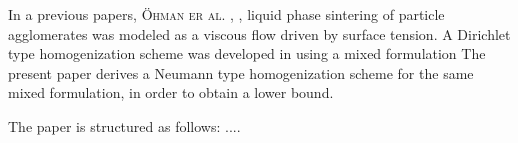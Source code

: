 \documentclass[12pt,a4paper,fleqn]{article}
\begin{document}
In a previous papers, \textsc{\"Ohman er al.} \cite{Ohman2012a}, \cite{Ohman2012b}, liquid phase sintering of particle agglomerates was modeled as a viscous flow driven by surface tension. A Dirichlet type homogenization scheme was developed in \cite{Ohman2012b} using a mixed formulation 
The present paper derives a Neumann type homogenization scheme for the same mixed formulation, in order to obtain a lower bound.
% 

The paper is structured as follows:
....
\end{document}
